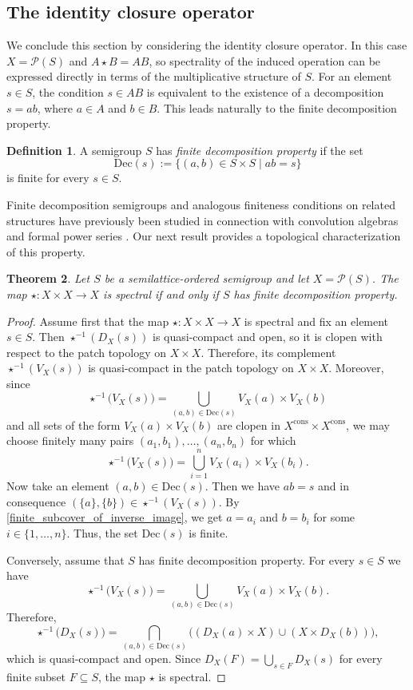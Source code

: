\documentclass[10pt, reqno]{amsart}
\theoremstyle{plain}
\newtheorem{theorem}{Theorem}[section]
\theoremstyle{definition}
\newtheorem{definition}[theorem]{Definition}
\begin{document}
\subsection{The identity closure operator}
We conclude this section by considering the identity closure operator. In this case $X = \mathcal{P}(S)$ and $A \star B = AB$, so spectrality of the induced operation can be expressed directly in terms of the multiplicative structure of $S$. For an element $s\in S$, the condition $s\in AB$ is equivalent to the existence of a decomposition $s = ab$, where $a\in A$ and $b\in B$. This leads naturally to the finite decomposition property. 
\begin{definition}\cite[Section 2]{DeneufchatelDuchamp}
    A semigroup $S$ has \emph{finite decomposition property} if the set $$\mathrm{Dec}(s) := \big\{(a, b) \in S \times S \mid ab = s\big\}$$ is finite for every $s \in S$. 
\end{definition}
Finite decomposition semigroups and analogous finiteness conditions on related structures have previously been studied in connection with convolution algebras and formal power series \cite{DeneufchatelDuchamp, FahrenbergJohansenStruthZiemianski}. Our next result provides a topological characterization of this property. 
\begin{theorem}\label{spectrality_is_equivalent_to_finite_decomposition_property}
    Let $S$ be a semilattice-ordered semigroup and let $X = \mathcal{P}(S)$. The map $\star : X \times X \to X$ is spectral if and only if $S$ has finite decomposition property. 
\end{theorem}
\begin{proof}
    Assume first that the map $\star: X \times X \to X$ is spectral and fix an element $s\in S$. Then $\star^{-1}(D_X(s))$ is quasi-compact and open, so it is clopen with respect to the patch topology on $X \times X$. Therefore, its complement $\star^{-1}(V_X(s))$ is quasi-compact in the patch topology on $X \times X$. Moreover, since $$\star^{-1}\big(V_X(s)\big) = \bigcup_{(a, b)\in\mathrm{Dec}(s)} V_X(a) \times V_X(b)$$ and all sets of the form $V_X(a) \times V_X(b)$ are clopen in $X^\mathrm{cons} \times X^\mathrm{cons}$, we may choose finitely many pairs $(a_1, b_1), \ldots, (a_n, b_n)$ for which 
    \begin{equation}\label{finite_subcover_of_inverse_image}
        \star^{-1}\big(V_X(s)\big) = \bigcup_{i = 1}^n V_X(a_i) \times V_X(b_i).
    \end{equation}
    Now take an element $(a, b)\in\mathrm{Dec}(s)$. Then we have $ab = s$ and in consequence $(\{a\}, \{b\})\in \star^{-1}(V_X(s))$. By \eqref{finite_subcover_of_inverse_image}, we get $a = a_i$ and $b = b_i$ for some $i\in\{1, \ldots, n\}$. Thus, the set $\mathrm{Dec}(s)$ is finite. 

    Conversely, assume that $S$ has finite decomposition property. For every $s \in S$ we have $$\star^{-1}\big(V_X(s)\big) = \bigcup_{(a,b)\in\mathrm{Dec}(s)}V_X(a) \times V_X(b).$$
    Therefore, $$\star^{-1}\big(D_X(s)\big) = \bigcap_{(a,b)\in\mathrm{Dec}(s)} \big((D_X(a) \times X) \cup (X \times D_X(b))\big),$$ which is quasi-compact and open. Since $D_X(F) = \bigcup_{s \in F} D_X(s)$ for every finite subset $F \subseteq S$, the map $\star$ is spectral. 
\end{proof}
\end{document}

